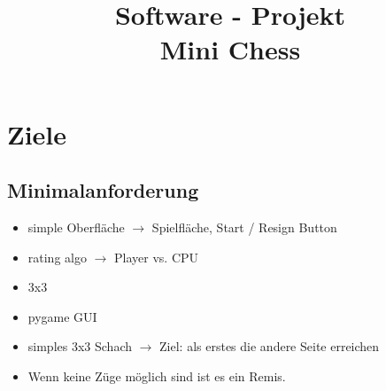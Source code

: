 \documentclass{article}
\title{\textbf{Software - Projekt\\Mini Chess}}
\date{\vspace{-5ex}}
\begin{document}
\maketitle
\thispagestyle{fancy}


\tableofcontents
\newpage


\section{Ziele}\label{section-goals}

\subsection{Minimalanforderung}
\begin{itemize}
    \item simple Oberfläche $\rightarrow$ Spielfläche, Start / Resign Button
    \item rating algo $\rightarrow$ Player vs. CPU
    \item 3x3
    \item pygame GUI
    \item simples 3x3 Schach $\rightarrow$ Ziel: als erstes die andere Seite erreichen
    \item Wenn keine Züge möglich sind ist es ein Remis.
\end{itemize}

\begin{figure}[h]
    \centering
\end{figure}
\end{document}

